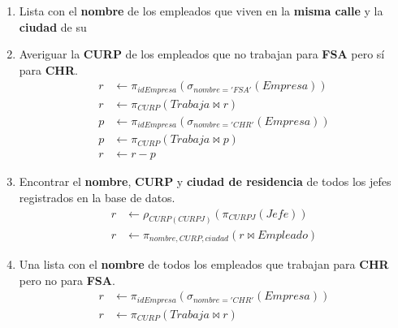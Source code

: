 \documentclass{article}
\begin{document}
\begin{enumerate}
{{\begin{enumerate}
{\begin{align*}
                            r &\leftarrow \pi_{nombre, CURP}(\sigma_{ciudad=ciudadEmpr}(r))
                        \end{align*}
                    }
                    \item {
                        Lista con el  \textbf{nombre} de los empleados que viven
                        en la \textbf{misma calle} y la \textbf{ciudad} de su
                    }
                    \item {
                        Averiguar la \textbf{CURP} de los empleados que no
                        trabajan para \textbf{FSA} pero sí para \textbf{CHR}.
                        \begin{align*}
                            r &\leftarrow \pi_{idEmpresa}(\sigma_{nombre = 'FSA'}(Empresa)) \\
                            r &\leftarrow \pi_{CURP}(Trabaja \bowtie r) \\
                            p &\leftarrow \pi_{idEmpresa}(\sigma_{nombre = 'CHR'}(Empresa)) \\
                            p &\leftarrow \pi_{CURP}(Trabaja \bowtie p) \\
                            r &\leftarrow r - p
                        \end{align*}
                    }
                    \item {
                        Encontrar el \textbf{nombre}, \textbf{CURP} y
                        \textbf{ciudad de residencia} de todos los jefes
                        registrados en la base de datos.
                        \begin{align*}
                            r &\leftarrow \rho_{CURP(CURPJ)}(\pi_{CURPJ}(Jefe)) \\
                            r &\leftarrow \pi_{nombre, CURP, ciudad}(r \bowtie Empleado)
                        \end{align*}
                    }
                    \item {
                        Una lista con el \textbf{nombre} de todos los empleados
                        que trabajan para  \textbf{CHR} pero no para
                        \textbf{FSA}.
                        \begin{align*}
                            r &\leftarrow \pi_{idEmpresa}(\sigma_{nombre = 'CHR'}(Empresa)) \\
                            r &\leftarrow \pi_{CURP}(Trabaja \bowtie r) \\

\end{align*}}
\end{enumerate}}}
\end{enumerate}
\end{document}
